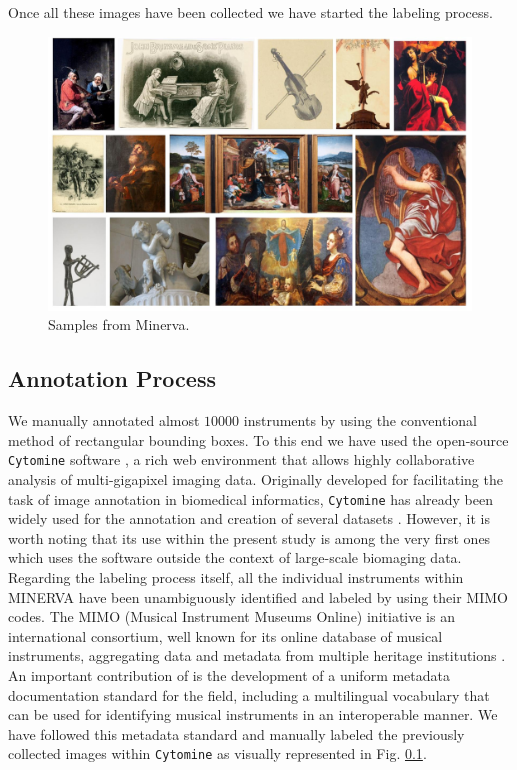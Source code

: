 Once all these images have been collected we have started the labeling process.


\begin{figure}[ht!]
\centering
  \includegraphics[width=\linewidth]{./Images/Chapter05/minerva}
  \caption{Samples from Minerva.}
  \label{fig:minerva_dataset}
\end{figure}

\subsection{Annotation Process}

We manually annotated almost $10000$ instruments by using the conventional method of rectangular bounding boxes. To this end we have used the open-source \texttt{Cytomine} software \cite{maree2016collaborative}, a rich web environment that allows highly collaborative analysis of multi-gigapixel imaging data. Originally developed for facilitating the task of image annotation in biomedical informatics, \texttt{Cytomine} has already been widely used for the annotation and creation of several datasets \cite{mormont2018comparison}. However, it is worth noting that its use within the present study is among the very first ones which uses the software outside the context of large-scale biomaging data. Regarding the labeling process itself, all the individual instruments within MINERVA have been unambiguously identified and labeled by using their MIMO codes. The MIMO (Musical Instrument Museums Online) initiative is an international consortium, well known for its online database of musical instruments, aggregating data and metadata from multiple heritage institutions \cite{dolan2017mimo}. An important contribution of \citet{dolan2017mimo} is the development of a uniform metadata documentation standard for the field, including a multilingual vocabulary that can be used for identifying musical instruments in an interoperable manner. We have followed this metadata standard and manually labeled the previously collected images within \texttt{Cytomine} as visually represented in Fig. \ref{}.

